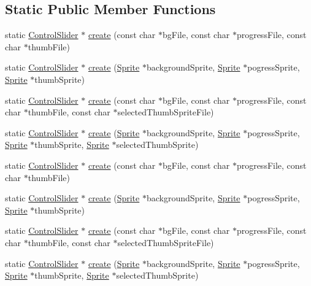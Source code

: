\subsection*{Static Public Member Functions}
\begin{DoxyCompactItemize}
\item 
static \hyperlink{classControlSlider}{Control\+Slider} $\ast$ \hyperlink{classControlSlider_a39748567b2f0b5b2ee63c866242eda68}{create} (const char $\ast$bg\+File, const char $\ast$progress\+File, const char $\ast$thumb\+File)
\item 
static \hyperlink{classControlSlider}{Control\+Slider} $\ast$ \hyperlink{classControlSlider_a8d3cb487abdd4b0f8d5fed8e127bf7c1}{create} (\hyperlink{classSprite}{Sprite} $\ast$background\+Sprite, \hyperlink{classSprite}{Sprite} $\ast$pogress\+Sprite, \hyperlink{classSprite}{Sprite} $\ast$thumb\+Sprite)
\item 
static \hyperlink{classControlSlider}{Control\+Slider} $\ast$ \hyperlink{classControlSlider_a6e57ca5a50445b6d43caab83cde335fe}{create} (const char $\ast$bg\+File, const char $\ast$progress\+File, const char $\ast$thumb\+File, const char $\ast$selected\+Thumb\+Sprite\+File)
\item 
static \hyperlink{classControlSlider}{Control\+Slider} $\ast$ \hyperlink{classControlSlider_aff78b4e336dd49834bcf0b6982ab620e}{create} (\hyperlink{classSprite}{Sprite} $\ast$background\+Sprite, \hyperlink{classSprite}{Sprite} $\ast$pogress\+Sprite, \hyperlink{classSprite}{Sprite} $\ast$thumb\+Sprite, \hyperlink{classSprite}{Sprite} $\ast$selected\+Thumb\+Sprite)
\item 
static \hyperlink{classControlSlider}{Control\+Slider} $\ast$ \hyperlink{classControlSlider_a86059da200464edbbf77b7bf62493e24}{create} (const char $\ast$bg\+File, const char $\ast$progress\+File, const char $\ast$thumb\+File)
\item 
static \hyperlink{classControlSlider}{Control\+Slider} $\ast$ \hyperlink{classControlSlider_a1fe3890d14909cd8b1cc878f74ec9d8a}{create} (\hyperlink{classSprite}{Sprite} $\ast$background\+Sprite, \hyperlink{classSprite}{Sprite} $\ast$pogress\+Sprite, \hyperlink{classSprite}{Sprite} $\ast$thumb\+Sprite)
\item 
static \hyperlink{classControlSlider}{Control\+Slider} $\ast$ \hyperlink{classControlSlider_a827baf7d006d93aad3f0ad395c066a67}{create} (const char $\ast$bg\+File, const char $\ast$progress\+File, const char $\ast$thumb\+File, const char $\ast$selected\+Thumb\+Sprite\+File)
\item 
static \hyperlink{classControlSlider}{Control\+Slider} $\ast$ \hyperlink{classControlSlider_a38a49333cf479f0319bb129ddb9ceda1}{create} (\hyperlink{classSprite}{Sprite} $\ast$background\+Sprite, \hyperlink{classSprite}{Sprite} $\ast$pogress\+Sprite, \hyperlink{classSprite}{Sprite} $\ast$thumb\+Sprite, \hyperlink{classSprite}{Sprite} $\ast$selected\+Thumb\+Sprite)
\end{DoxyCompactItemize}
